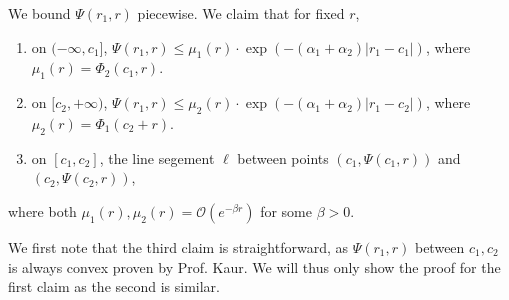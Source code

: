 \documentclass[12pt]{article}
\begin{document}
We bound \(\Psi(r_1,r)\) piecewise. We claim that for fixed \(r\),
\begin{enumerate}
    \item on \((-\infty, c_1]\), \(\Psi(r_1,r) \leq \mu_1(r) \cdot \exp(-(\alpha_1 + \alpha_2)|r_1-c_1|)\), where \(\mu_1(r) = \Phi_2(c_1,r)\).
    \item on \([c_2,+\infty)\), \(\Psi(r_1,r) \leq \mu_2(r) \cdot \exp(-(\alpha_1 + \alpha_2)|r_1-c_2|)\), where \(\mu_2(r) = \Phi_1(c_2+r).\)
    \item on \([c_1,c_2]\), the line segement \(\ell\) between points \((c_1, \Psi(c_1,r))\) and \((c_2, \Psi(c_2,r))\),
\end{enumerate}
where both \(\mu_1(r), \mu_2(r) = \mathcal{O}(e^{-\beta r})\) for some \(\beta > 0\).

We first note that the third claim is straightforward, as \(\Psi(r_1,r)\) between \(c_1,c_2\) is always convex proven by Prof. Kaur. We will thus only show the proof for the first claim as the second is similar.
\end{document}
